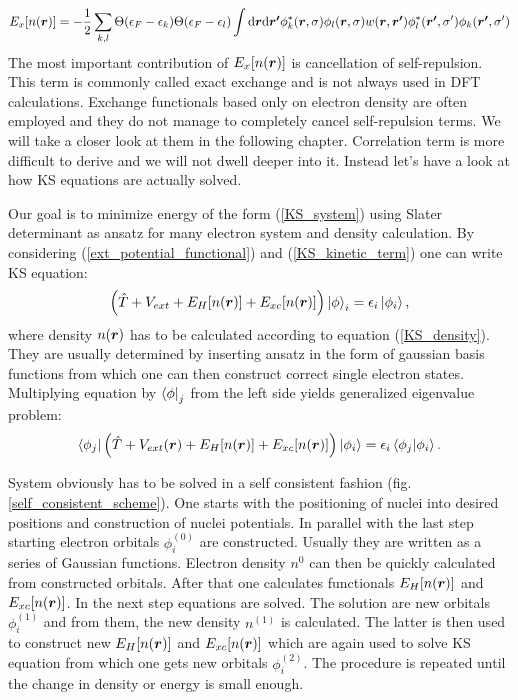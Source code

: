 \documentclass[openany, longbibliography,slovene,a4paper,12pt]{article}
\def\vec#1{\mbox{\boldmath$#1$}}
\newcommand{\dif}{\mathrm{d}}
\begin{document}
\begin{equation}
  E_{x}[n(\vec r)]=-\frac{1}{2}\sum_{k,l}\Theta(\epsilon_F-\epsilon_k)\Theta(\epsilon_F-\epsilon_l)\int \dif \vec{r} \dif \vec{r'}\phi^*_k(\vec r, \sigma)\phi_l(\vec{r}, \sigma)w(\vec{r},\vec{r'})\phi^*_l(\vec{r'}, \sigma')\phi_k(\vec{r'}, \sigma')
\end{equation}
The most important contribution of $E_{x}[n(\vec r)]$ is cancellation of
self-repulsion. This term is commonly called exact exchange and is not always
used in DFT calculations. Exchange functionals based only on
electron density are often employed and they do not manage to completely cancel
self-repulsion terms. We will take a closer look at them in the following chapter.
Correlation term is more difficult to derive and we will not dwell deeper into
it. Instead let's have a look at how KS equations are actually solved.

Our goal is to minimize energy of the form (\ref{KS_system}) using Slater
determinant as ansatz for many electron system and density calculation. By
considering (\ref{ext_potential_functional}) and (\ref{KS_kinetic_term}) one can
write KS equation:  
\begin{equation}
  \left( \hat T + V_{ext} + E_H[n(\vec r)]  + E_{xc}[n(\vec r)] \right) \ket \phi_i =  \epsilon_i \ket{\phi_i},  
\end {equation}
where density $n(\vec r)$  has to be calculated according to equation
(\ref{KS_density}). They are usually determined by inserting ansatz in the
form of gaussian basis functions from which one can
then construct correct single electron states. Multiplying equation by $\bra
\phi_j$ from the left side yields generalized eigenvalue problem:
\begin{equation}
  \bra {\phi_j} \left( \hat T + V_{ext}(\vec r) + E_H[n(\vec r)]  + E_{xc}[n(\vec r)] \right) \ket{\phi_i} =  \epsilon_i \braket{ \phi_j |\phi_i }.
\end {equation}

System obviously has to be solved in a self consistent fashion
(fig. \ref{self_consistent_scheme}). One starts with the positioning of nuclei into
desired positions and construction of nuclei potentials. In parallel with the
last step starting electron orbitals $\phi^{(0)}_i$ are constructed. Usually they are written
as a series of Gaussian functions. Electron density $n^0$ can then be quickly
calculated from constructed orbitals. After that one
calculates functionals $E_H[n(\vec r)]$ and $E_{xc}[n(\vec r)]$. In the next step
equations are solved. The solution are new orbitals $\phi_i^{(1)}$  and from
them, the new density $n^{(1)}$ is calculated. The latter is then used to construct new $E_H[n(\vec r)]$ and $E_{xc}[n(\vec r)]$ which are again used to
solve KS equation from which one gets new orbitals $\phi_i^{(2)}$. The procedure is
repeated until the change in density or energy is small enough. 
\end{document}
